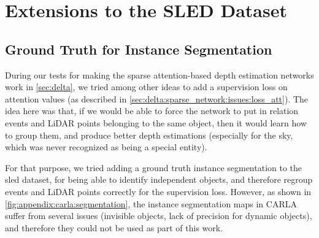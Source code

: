 \section{Extensions to the SLED Dataset}

\subsection{Ground Truth for Instance Segmentation}
During our tests for making the sparse attention-based depth estimation networks work in \cref{sec:delta}, we tried among other ideas to add a supervision loss on attention values (as described in \cref{sec:delta:sparse_network:issues:loss_att}). The idea here was that, if we would be able to force the network to put in relation events and LiDAR points belonging to the same object, then it would learn how to group them, and produce better depth estimations (especially for the sky, which was never recognized as being a special entity).

For that purpose, we tried adding a ground truth instance segmentation to the \acrshort{sled} dataset, for being able to identify independent objects, and therefore regroup events and LiDAR points correctly for the supervision loss. However, as shown in \cref{fig:appendix:carla:segmentation}, the instance segmentation maps in CARLA suffer from several issues (invisible objects, lack of precision for dynamic objects), and therefore they could not be used as part of this work.

